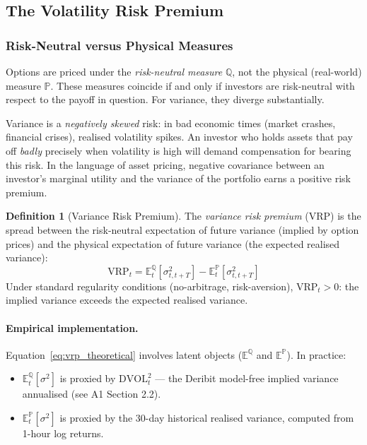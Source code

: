 \documentclass[12pt, a4paper]{article}
\theoremstyle{plain}
\theoremstyle{definition}
\newtheorem{definition}{Definition}[section]
\newcommand{\E}{\mathbb{E}}
\newcommand{\VRP}{\mathrm{VRP}}
\begin{document}
\subsection{The Volatility Risk Premium}
\label{sec:vrp_theory}

\subsubsection{Risk-Neutral versus Physical Measures}

Options are priced under the \emph{risk-neutral measure} $\mathbb{Q}$,
not the physical (real-world) measure $\mathbb{P}$.  These measures
coincide if and only if investors are risk-neutral with respect to the
payoff in question.  For variance, they diverge substantially.

Variance is a \emph{negatively skewed} risk: in bad economic times
(market crashes, financial crises), realised volatility spikes.  An
investor who holds assets that pay off \emph{badly} precisely when
volatility is high will demand compensation for bearing this risk.
In the language of asset pricing, negative covariance between an
investor's marginal utility and the variance of the portfolio earns a
positive risk premium.

\begin{definition}[Variance Risk Premium]
  The \emph{variance risk premium} (VRP) is the spread between the
  risk-neutral expectation of future variance (implied by option prices)
  and the physical expectation of future variance (the expected
  realised variance):
  \begin{equation}
    \VRP_t = \E^{\mathbb{Q}}_t[\sigma^2_{t, t+T}]
             - \E^{\mathbb{P}}_t[\sigma^2_{t, t+T}]
    \label{eq:vrp_theoretical}
  \end{equation}
  Under standard regularity conditions (no-arbitrage, risk-aversion),
  $\VRP_t > 0$: the implied variance exceeds the expected realised variance.
\end{definition}

\paragraph{Empirical implementation.}
Equation~\eqref{eq:vrp_theoretical} involves latent objects
($\E^{\mathbb{Q}}$ and $\E^{\mathbb{P}}$).  In practice:
\begin{itemize}[noitemsep]
  \item $\E^{\mathbb{Q}}_t[\sigma^2]$ is proxied by $\mathrm{DVOL}_t^2$
        --- the Deribit model-free implied variance annualised (see A1 Section 2.2).
  \item $\E^{\mathbb{P}}_t[\sigma^2]$ is proxied by the 30-day historical
        realised variance, computed from 1-hour log returns.
\end{itemize}
\end{document}
